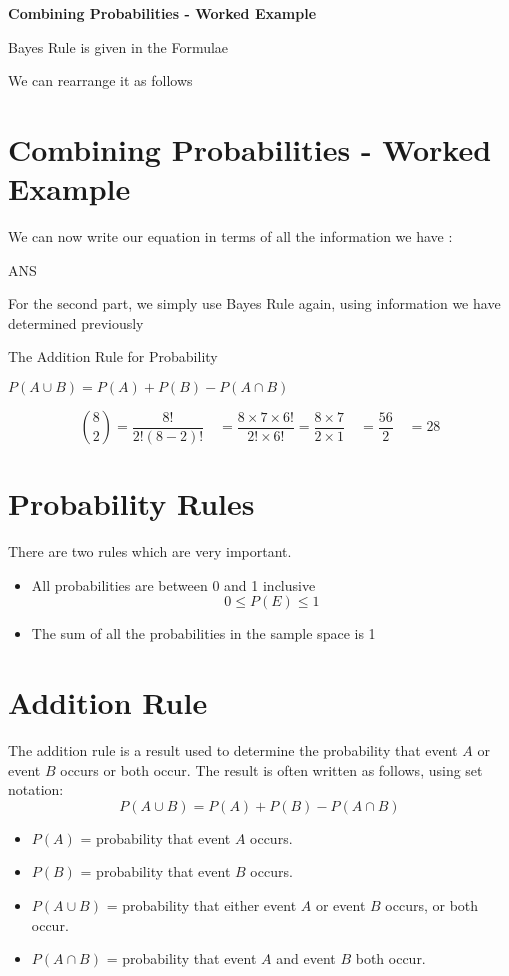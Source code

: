 \documentclass[]{report}
\begin{document}
\textbf{Combining Probabilities - Worked Example}

Bayes Rule is given in the Formulae  

We can rearrange it as follows  



\section{Combining Probabilities - Worked Example}
We can now write our equation in terms of all the information we have :

ANS

For the second part, we simply use Bayes Rule again, using information we have determined previously


The Addition Rule for Probability

$P(A \cup B ) = P(A) + P(B) - P(A \cap B)$

\[{8 \choose 2} =\frac{8!}{2!(8-2)!} \quad = \frac{8\times7\times6!}{2!\times 6!} = \frac{8\times7}{2\times 1} \quad = \frac{56}{2} \quad = 28\]


\section{Probability Rules}

There are two rules which are very important.
\begin{itemize}
\item All probabilities are between 0 and 1 inclusive
\[0 \leq P(E) \leq 1\]
\item The sum of all the probabilities in the sample space is 1
\end{itemize}

\section{Addition Rule}
The addition rule is a result used to determine the probability that event $A$ or
event $B$ occurs or both occur. The result is often written as follows, using set
notation:
\[ P(A\cup B) = P(A) + P(B)- P(A \cap B)\] 
\begin{itemize}
\item $P(A)$ = probability that event $A$ occurs.
\item $P(B)$ = probability that event $B$ occurs.
\item $P(A\cup B)$ = probability that either event $A$ or event $B$ occurs, or both
occur.
\item $P(A\cap B)$ = probability that event $A$ and event $B$ both occur.
\end{itemize}\bigskip
\end{document}
